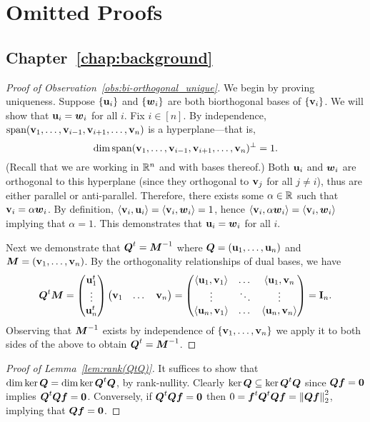 \appendix 
\chapter{Omitted Proofs}
\label{chap:app}

\section{Chapter~\ref{chap:background}}
\label{sec:app_proofs_background}


\begin{proof}[Proof  of  Observation~\ref{obs:bi-orthogonal_unique}]
	We begin by  proving uniqueness. 
	Suppose $\{\vb{u}_i\}$ and $\{\vb*{w}_i\}$ are both biorthogonal bases of $\{\vb{v}_i\}$. We will show that $\vb{u}_i=\vb*{w}_i$  for all $i$. Fix $i\in[n]$. By independence, $\textnormal{span}(\vb{v}_1,\dots,\vb{v}_{i-1},\vb{v}_{i+1},\dots,\vb{v}_n)$ is a hyperplane---that is, \[\dim\textnormal{span}(\vb{v}_1,\dots,\vb{v}_{i-1},\vb{v}_{i+1},\dots,\vb{v}_n)^\perp=1.\] (Recall  that we are  working in $\mathbb{R}^n$ and with bases thereof.) Both $\vb{u}_i$ and $\vb*{w}_i$ are orthogonal to this hyperplane (since they orthogonal to $\vb{v}_j$ for all $j\neq i$), thus are either parallel or anti-parallel. Therefore, there exists some $\alpha\in\mathbb{R}$ such that $\vb{v}_i=\alpha\vb*{w}_i$. By definition, $\langle \vb{v}_i,\vb{u}_i\rangle = \langle \vb{v}_i,\vb*{w}_i\rangle =1$, hence $\langle \vb{v}_i,\alpha \vb*{w}_i\rangle = \langle \vb{v}_i,\vb*{w}_i\rangle$ implying that $\alpha=1$. This demonstrates that $\vb{u}_i=\vb*{w}_i$ for all $i$. 
	
	Next we demonstrate that  $\vb*{Q}^t={\vb*{M}}^{-1}$ where $\vb*{Q}=(\vb{u}_1,\dots,\vb{u}_n)$ and ${\vb*{M}}=(\vb{v}_1,\dots,\vb{v}_n)$. By the orthogonality relationships of dual bases, we have  
	\[\vb*{Q}^t{\vb*{M}} = \begin{pmatrix}
	\vb{u}_1^t \\
	\vdots  \\
	\vb{u}_n^t
	\end{pmatrix}
	\begin{pmatrix}
	\vb{v}_1 & \dots & \vb{v}_n
	\end{pmatrix} = \begin{pmatrix}
	\langle \vb{u}_1,\vb{v}_1\rangle & \dots & \langle \vb{u}_1,\vb{v}_n \\
	\vdots & \ddots & \vdots  \\
	\langle \vb{u}_n,\vb{v}_1\rangle & \dots & \langle \vb{u}_n,\vb{v}_n\rangle 
	\end{pmatrix} = \vb{I}_n.
	\]
	Observing that ${\vb*{M}}^{-1}$ exists by independence of $\{\vb{v}_1,\dots,\vb{v}_n\}$ we apply it  to  both sides of the  above to obtain   $\vb*{Q}^t={\vb*{M}}^{-1}$. 
\end{proof}

\begin{proof}[Proof of Lemma~\ref{lem:rank(QtQ)}]
	It suffices to show that $\dim\ker\vb*{Q} = \dim\ker\vb*{Q}^t \vb*{Q}$, by rank-nullity. Clearly $\ker\vb*{Q} \subseteq \ker\vb*{Q}^t\vb*{Q}$ since $\vb*{Q}\vb*{f}=\vb{0}$ implies $\vb*{Q}^t\vb*{Q}\vb*{f}=\vb{0}$. Conversely, if $\vb*{Q}^t\vb*{Q}\vb*{f}=\vb{0}$ then $0=\vb*{f}^t \vb*{Q}^t \vb*{Q}\vb*{f} = \norm{\vb*{Q}\vb*{f}}_2^2$, implying that $\vb*{Q}\vb*{f}=\vb{0}$.  
\end{proof}

